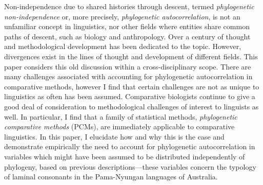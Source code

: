 Non-independence due to shared histories through descent, termed \emph{phylogenetic non-independence} or, more precisely, \emph{phylogenetic autocorrelation}, is not an unfamiliar concept in linguistics, nor other fields where entities share common paths of descent, such as biology and anthropology. Over a century of thought and methodological development has been dedicated to the topic. However, divergences exist in the lines of thought and development of different fields. This paper considers this old discussion within a cross-disciplinary scope. There are many challenges associated with accounting for phylogenetic autocorrelation in comparative methods, however I find that certain challenges are not as unique to linguistics as often has been assumed. Comparative biologists continue to give a good deal of consideration to methodological challenges of interest to linguists as well. In particular, I find that a family of statistical methods, \emph{phylogenetic comparative methods} (PCMs), are immediately applicable to comparative linguistics. In this paper, I elucidate how and why this is the case and demonstrate empirically the need to account for phylogenetic autocorrelation in variables which might have been assumed to be distributed independently of phylogeny, based on previous descriptions---these variables concern the typology of laminal consonants in the Pama-Nyungan languages of Australia.

